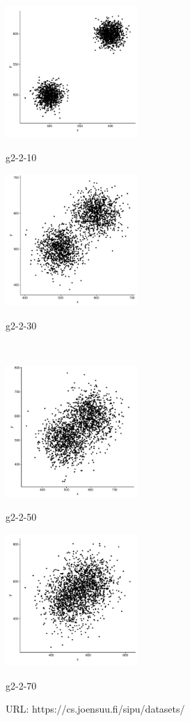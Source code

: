 \documentclass[a4paper,10pt]{article}
\theoremstyle{plain}
\theoremstyle{definition}
\begin{document}
\begin{figure}[H]
	\centering
	\begin{minipage}{5cm}
		\includegraphics[width=5cm]{./pictures/G2/g2-2-10.pdf}
		\caption*{g2-2-10}
		\label{g2-2-10}
	\end{minipage}
	\begin{minipage}{5cm}
		\includegraphics[width=5cm]{./pictures/G2/g2-2-30.pdf}
		\caption*{g2-2-30}
		\label{g2-2-30}
	\end{minipage}
	\\
	\begin{minipage}{5cm}
		\includegraphics[width=5cm]{./pictures/G2/g2-2-50.pdf}
		\caption*{g2-2-50}
		\label{g2-2-50}
	\end{minipage}
	\begin{minipage}{5cm}
		\includegraphics[width=5cm]{./pictures/G2/g2-2-70.pdf}
		\caption*{g2-2-70}
		\label{g2-2-70}
	\end{minipage}
	
	\caption{URL: https://cs.joensuu.fi/sipu/datasets/}
	\label{fig:g2-combined}
\end{figure}
\end{document}
